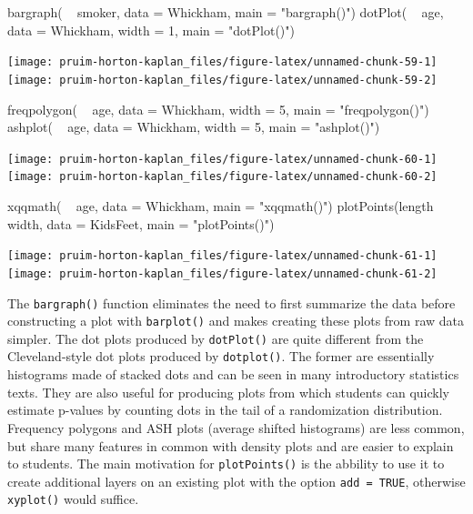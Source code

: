 \begin{Schunk}
\begin{Sinput}
bargraph( ~ smoker, data = Whickham, main = "bargraph()")
dotPlot( ~ age, data = Whickham, width = 1, main = "dotPlot()")
\end{Sinput}


\begin{center}\texttt{[image: pruim-horton-kaplan\_files/figure-latex/unnamed-chunk-59-1]} \texttt{[image: pruim-horton-kaplan\_files/figure-latex/unnamed-chunk-59-2]} \end{center}

\end{Schunk}\begin{Schunk}
\begin{Sinput}
freqpolygon( ~ age, data = Whickham, width = 5, main = "freqpolygon()")
ashplot( ~ age, data = Whickham, width = 5, main = "ashplot()")
\end{Sinput}


\begin{center}\texttt{[image: pruim-horton-kaplan\_files/figure-latex/unnamed-chunk-60-1]} \texttt{[image: pruim-horton-kaplan\_files/figure-latex/unnamed-chunk-60-2]} \end{center}

\end{Schunk}\begin{Schunk}
\begin{Sinput}
xqqmath( ~ age, data = Whickham, main = "xqqmath()")
plotPoints(length ~ width, data = KidsFeet, main = "plotPoints()")
\end{Sinput}


\begin{center}\texttt{[image: pruim-horton-kaplan\_files/figure-latex/unnamed-chunk-61-1]} \texttt{[image: pruim-horton-kaplan\_files/figure-latex/unnamed-chunk-61-2]} \end{center}

\end{Schunk}

The \texttt{bargraph()} function eliminates the need to first summarize
the data before constructing a plot with \texttt{barplot()} and makes
creating these plots from raw data simpler. The dot plots produced by
\texttt{dotPlot()} are quite different from the Cleveland-style dot
plots produced by \texttt{dotplot()}. The former are essentially
histograms made of stacked dots and can be seen in many introductory
statistics texts. They are also useful for producing plots from which
students can quickly estimate p-values by counting dots in the tail of a
randomization distribution. Frequency polygons and ASH plots (average
shifted histograms) are less common, but share many features in common
with density plots and are easier to explain to students. The main
motivation for \texttt{plotPoints()} is the abbility to use it to create
additional layers on an existing plot with the option
\texttt{add\ =\ TRUE}, otherwise \texttt{xyplot()} would suffice.

